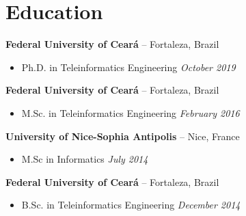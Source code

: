 \section{Education}

{\bf Federal University of Ceará} -- Fortaleza, Brazil
\begin{itemize}
	\item[] Ph.D. in Teleinformatics Engineering \hfill {\it October 2019}
\end{itemize}

{\bf Federal University of Ceará} -- Fortaleza, Brazil
\begin{itemize}
	\item[] M.Sc. in Teleinformatics Engineering \hfill {\it February 2016}
\end{itemize}

{\bf University of Nice-Sophia Antipolis} -- Nice, France
\begin{itemize}
	\item[] M.Sc in Informatics \hfill {\it July 2014}
\end{itemize}

{\bf Federal University of Ceará} -- Fortaleza, Brazil
\begin{itemize}
	\item[] B.Sc. in Teleinformatics Engineering \hfill {\it December 2014}
\end{itemize}